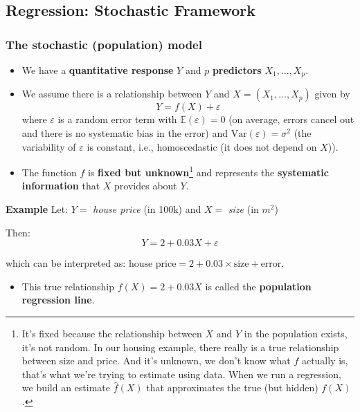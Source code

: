 \documentclass[
  letterpaper,
  DIV=11,
  numbers=noendperiod]{scrartcl}
\providecommand{\tightlist}{%
  \setlength{\itemsep}{0pt}\setlength{\parskip}{0pt}}\usepackage{longtable,booktabs,array}
\begin{document}
\subsection{Regression: Stochastic
Framework}\label{regression-stochastic-framework}

\subsubsection{The stochastic (population)
model}\label{the-stochastic-population-model}

\begin{itemize}
\item
  We have a \textbf{quantitative response} \(Y\) and \(p\)
  \textbf{predictors} \(X_1, \ldots, X_p\).
\item
  We assume there is a relationship between \(Y\) and
  \(X = (X_1, \ldots, X_p)\) given by \[Y = f(X) + \varepsilon\] where
  \(\varepsilon\) is a random error term with
  \(\mathbb{E}(\varepsilon) = 0\) (on average, errors cancel out and
  there is no systematic bias in the error) and
  \(\text{Var}(\varepsilon) = \sigma^2\) (the variability of
  \(\varepsilon\) is constant, i.e., homoscedastic (it does not depend
  on \(X\))).
\item
  The function \(f\) is \textbf{fixed but unknown}\footnote{It's fixed
    because the relationship between \(X\) and \(Y\) in the population
    exists, it's not random. In our housing example, there really is a
    true relationship between size and price. And it's unknown, we don't
    know what \(f\) actually is, that's what we're trying to estimate
    using data. When we run a regression, we build an estimate
    \(\hat{f}(X)\) that approximates the true (but hidden) \(f(X)\).}
  and represents the \textbf{systematic information} that \(X\) provides
  about \(Y\).
\end{itemize}

\textbf{Example} Let: \(Y =\) \emph{house price} (in 100k) and \(X =\)
\emph{size} (in \(m^2\))

Then: \[Y = 2 + 0.03X + \varepsilon\]

which can be interpreted as:
\(\text{house price} = 2 + 0.03 \times \text{size} + \text{error}\).

\begin{itemize}
\tightlist
\item
  This true relationship \(f(X) = 2 + 0.03X\) is called the
  \textbf{population regression line}.
\end{itemize}
\end{document}
